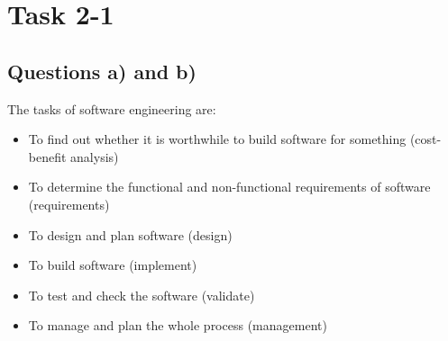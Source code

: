 \chapter{Task 2-1}
\section{Questions a) and b)}
 The tasks of software engineering are: 
 \begin{itemize}
 	\item To find out whether it is worthwhile to build software for something (cost-benefit analysis)
 	\item To determine the functional and non-functional requirements of software (requirements)
 	\item To design and plan software (design)
 	\item To build software (implement)
 	\item To test and check the software (validate)
 	\item To manage and plan the whole process (management)
 \end{itemize}
      
 
 